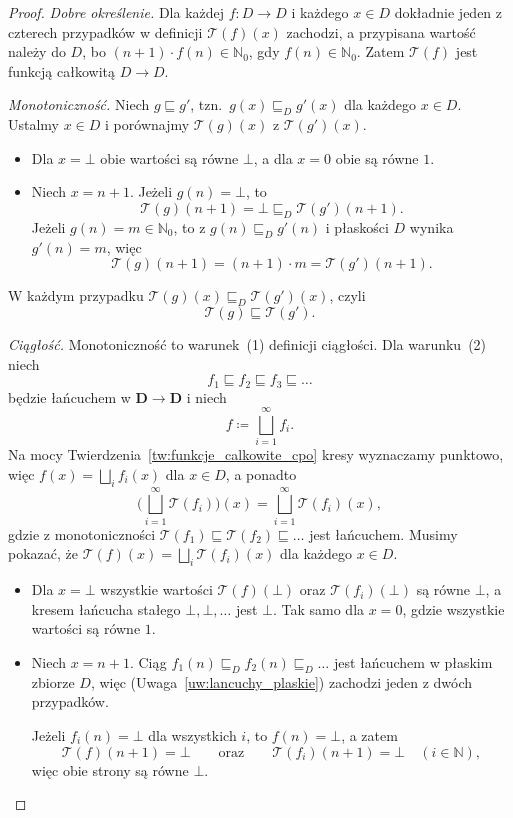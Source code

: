 \documentclass[11pt,a4paper]{article}
\theoremstyle{definition}
\theoremstyle{plain}
\newcommand{\bt}{\bot}                            %
\begin{document}
\begin{proof}
	\emph{Dobre określenie.} Dla każdej $f:D\to D$ i każdego $x\in D$
	dokładnie jeden z czterech przypadków w definicji $\mathcal T(f)(x)$
	zachodzi, a przypisana wartość należy do $D$, bo
	$(n+1)\cdot f(n)\in\mathbb N_0$, gdy $f(n)\in\mathbb N_0$. Zatem
	$\mathcal T(f)$ jest funkcją całkowitą $D\to D$.
	
	\emph{Monotoniczność.} Niech $g\sqsubseteq g'$, tzn.\
	$g(x)\sqsubseteq_D g'(x)$ dla każdego $x\in D$. Ustalmy $x\in D$
	i porównajmy $\mathcal T(g)(x)$ z $\mathcal T(g')(x)$.
	\begin{itemize}
		\item Dla $x=\bt$ obie wartości są równe $\bt$, a dla $x=0$ obie są
		równe $1$.
		\item Niech $x=n+1$. Jeżeli $g(n)=\bt$, to
		\[
		\mathcal T(g)(n+1)=\bt\sqsubseteq_D\mathcal T(g')(n+1).
		\]
		Jeżeli $g(n)=m\in\mathbb N_0$, to z $g(n)\sqsubseteq_D g'(n)$ i płaskości
		$D$ wynika $g'(n)=m$, więc
		\[
		\mathcal T(g)(n+1)=(n+1)\cdot m=\mathcal T(g')(n+1).
		\]
	\end{itemize}
	W każdym przypadku $\mathcal T(g)(x)\sqsubseteq_D\mathcal T(g')(x)$, czyli
	\[
	\mathcal T(g)\sqsubseteq\mathcal T(g').
	\]
	
	\emph{Ciągłość.} Monotoniczność to warunek~(1) definicji ciągłości.
	Dla warunku~(2) niech
	\[
	f_1\sqsubseteq f_2\sqsubseteq f_3\sqsubseteq\ldots
	\]
	będzie łańcuchem w $\boldsymbol{D\to D}$ i niech
	\[
	f\coloneqq\bigsqcup_{i=1}^{\infty}f_i.
	\]
	Na mocy Twierdzenia~\ref{tw:funkcje_calkowite_cpo} kresy wyznaczamy
	punktowo, więc $f(x)=\bigsqcup_i f_i(x)$ dla $x\in D$, a ponadto
	\[
	\Big(\bigsqcup_{i=1}^{\infty}\mathcal T(f_i)\Big)(x)
	=
	\bigsqcup_{i=1}^{\infty}\mathcal T(f_i)(x),
	\]
	gdzie z monotoniczności $\mathcal T(f_1)\sqsubseteq\mathcal T(f_2)\sqsubseteq\ldots$
	jest łańcuchem. Musimy pokazać, że
	$\mathcal T(f)(x)=\bigsqcup_i\mathcal T(f_i)(x)$ dla każdego $x\in D$.
	\begin{itemize}
		\item Dla $x=\bt$ wszystkie wartości $\mathcal T(f)(\bt)$ oraz
		$\mathcal T(f_i)(\bt)$ są równe $\bt$, a kresem łańcucha stałego
		$\bt,\bt,\ldots$ jest $\bt$. Tak samo dla $x=0$, gdzie wszystkie
		wartości są równe $1$.
		\item Niech $x=n+1$. Ciąg $f_1(n)\sqsubseteq_D f_2(n)\sqsubseteq_D\ldots$
		jest łańcuchem w płaskim zbiorze $D$, więc
		(Uwaga~\ref{uw:lancuchy_plaskie}) zachodzi jeden z dwóch przypadków.
		
		Jeżeli $f_i(n)=\bt$ dla wszystkich $i$, to $f(n)=\bt$, a zatem
		\[
		\mathcal T(f)(n+1)=\bt
		\qquad\text{oraz}\qquad
		\mathcal T(f_i)(n+1)=\bt\quad(i\in\mathbb N),
		\]
		więc obie strony są równe $\bt$.
		

\end{itemize}
\end{proof}
\end{document}
